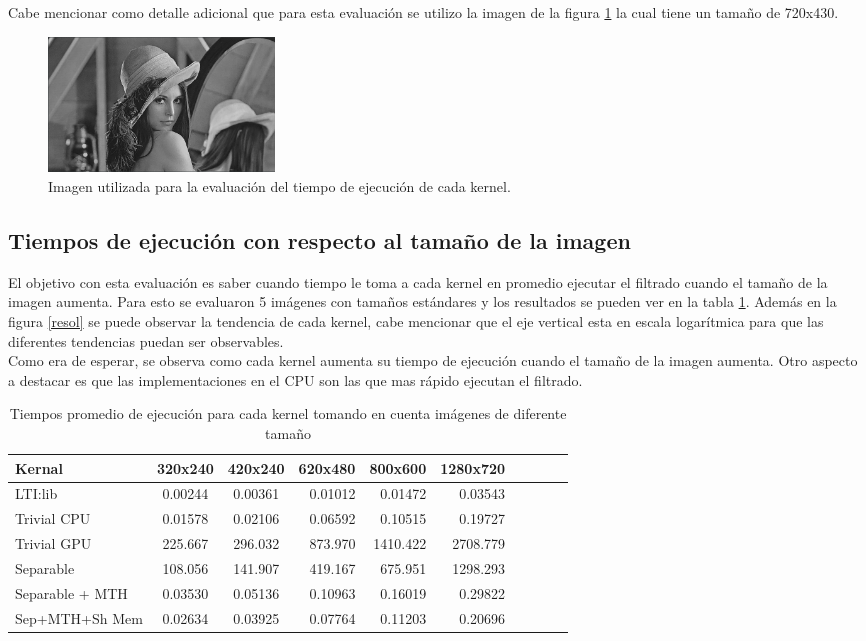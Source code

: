 \documentclass[conference]{IEEEtran}
\begin{document}
Cabe mencionar como detalle adicional que para esta evaluación se utilizo la imagen de la figura \ref{lenna} la cual tiene un tamaño de 720x430. 

\begin{figure}[H]
\centering
\includegraphics[width=6cm]{lenna}
\caption{Imagen utilizada para la evaluación del tiempo de ejecución de cada kernel.}
\label{lenna}
\end{figure}

\subsection{\textbf{Tiempos de ejecución con respecto al tamaño de la imagen}}
El objetivo con esta evaluación es saber cuando tiempo le toma a cada kernel en promedio ejecutar el filtrado cuando el tamaño de la imagen aumenta. Para esto se evaluaron 5 imágenes con tamaños estándares y los resultados se pueden ver en la tabla \ref{table_optimizacion_resol}. Además en la figura \ref{resol} se puede observar la tendencia de cada kernel, cabe mencionar que el eje vertical esta en escala logarítmica para que las diferentes tendencias puedan ser observables.\\

Como era de esperar, se observa como cada kernel aumenta su tiempo de ejecución cuando el tamaño de la imagen aumenta. Otro aspecto a destacar es que las implementaciones en el CPU son las que mas rápido ejecutan el filtrado.

\begin{table}[h]
\caption{Tiempos promedio de ejecución para cada kernel tomando en cuenta imágenes de diferente tamaño} %
\centering %
\begin{tabular}{l c c rrrrrrr} %
\hline\hline %
Kernal & 320x240 & 420x240 & 620x480 & 800x600 & 1280x720\\ [0.5ex]
\hline %
LTI:lib & 0.00244&	0.00361 &	0.01012 &	0.01472&	0.03543\\[0.5ex]
Trivial CPU & 0.01578	&0.02106&	0.06592&	0.10515	&0.19727\\[0.5ex]
Trivial GPU & 225.667	&296.032	&873.970&	1410.422&	2708.779\\[0.5ex]
Separable & 108.056	&141.907&	419.167&	675.951	&1298.293\\ [0.5ex]
Separable + MTH & 0.03530&	0.05136&0.10963&	0.16019	&0.29822\\[0.5ex]
Sep+MTH+Sh Mem & 0.02634	&0.03925	&0.07764&	0.11203&0.20696\\[0.5ex]
\hline %
\end{tabular}
\label{table_optimizacion_resol}
\end{table}
\end{document}

